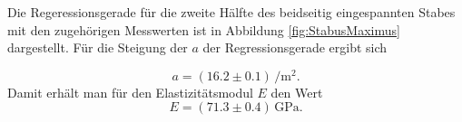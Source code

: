 Die Regeressionsgerade für die zweite Hälfte des beidseitig eingespannten Stabes  mit den
zugehörigen Messwerten ist in Abbildung \ref{fig:StabusMaximus} dargestellt.
Für die Steigung der $a$ der Regressionsgerade ergibt sich

\begin{equation*}
	a = (16.2\pm 0.1)\,\si{\per\square\meter}  \mathrm{.}
\end{equation*}
Damit erhält man für den Elastizitätsmodul $E$ den Wert
\begin{equation*}
	E =(71.3 \pm 0.4) \, \si{\giga\pascal} \mathrm{.}
\end{equation*}
